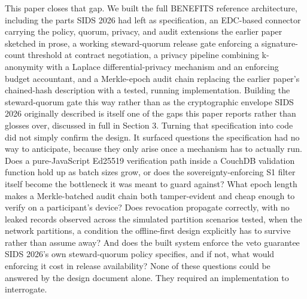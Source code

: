 This paper closes that gap. We built the full BENEFITS reference architecture, including the parts SIDS 2026 had left as specification, an EDC-based connector carrying the policy, quorum, privacy, and audit extensions the earlier paper sketched in prose, a working steward-quorum release gate enforcing a signature-count threshold at contract negotiation, a privacy pipeline combining k-anonymity with a Laplace differential-privacy mechanism and an enforcing budget accountant, and a Merkle-epoch audit chain replacing the earlier paper's chained-hash description with a tested, running implementation. Building the steward-quorum gate this way rather than as the cryptographic envelope SIDS 2026 originally described is itself one of the gaps this paper reports rather than glosses over, discussed in full in Section 3. Turning that specification into code did not simply confirm the design. It surfaced questions the specification had no way to anticipate, because they only arise once a mechanism has to actually run. Does a pure-JavaScript Ed25519 verification path inside a CouchDB validation function hold up as batch sizes grow, or does the sovereignty-enforcing S1 filter itself become the bottleneck it was meant to guard against? What epoch length makes a Merkle-batched audit chain both tamper-evident and cheap enough to verify on a participant's device? Does revocation propagate correctly, with no leaked records observed across the simulated partition scenarios tested, when the network partitions, a condition the offline-first design explicitly has to survive rather than assume away? And does the built system enforce the veto guarantee SIDS 2026's own steward-quorum policy specifies, and if not, what would enforcing it cost in release availability? None of these questions could be answered by the design document alone. They required an implementation to interrogate.

